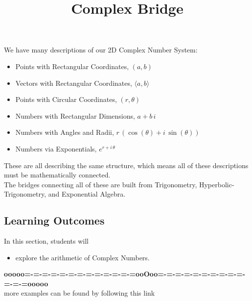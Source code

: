 \documentclass{ximera}
\title{Complex Bridge}
\begin{document}
\begin{abstract}
\end{abstract}
\maketitle




We have many descriptions of our 2D Complex Number System:

\begin{itemize}
\item Points with Rectangular Coordinates, $(a,b)$
\item Vectors with Rectangular Coordinates, $\langle a, b \rangle$
\item Points with Circular Coordinates, $(r,\theta)$
\item Numbers with Rectangular Dimensions, $a + b \, i$
\item Numbers with Angles and Radii, $r \, (\cos(\theta) + i \, \sin(\theta))$
\item Numbers via Exponentials, $e^{r + i \, \theta}$
\end{itemize}

These are all describing the same structure, which means all of these descriptions must be mathematically connected. \\


The bridges connecting all of these are built from Trigonometry, Hyperbolic-Trigonometry, and Exponential Algebra.





\subsection{Learning Outcomes}

\begin{sectionOutcomes}
In this section, students will 

\begin{itemize}
\item explore the arithmetic of Complex Numbers.
\end{itemize}
\end{sectionOutcomes}













\begin{center}
\textbf{\textcolor{green!50!black}{ooooo=-=-=-=-=-=-=-=-=-=-=-=-=ooOoo=-=-=-=-=-=-=-=-=-=-=-=-=ooooo}} \\

more examples can be found by following this link\\ 

\end{center}
\end{document}
